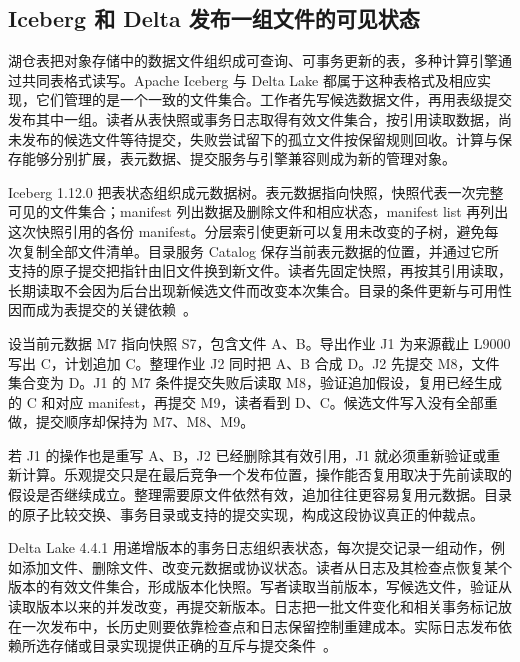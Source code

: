 \subsection{Iceberg 和 Delta 发布一组文件的可见状态}

湖仓表把对象存储中的数据文件组织成可查询、可事务更新的表，多种计算引擎通过共同表格式读写。Apache Iceberg 与 Delta Lake 都属于这种表格式及相应实现，它们管理的是一个一致的文件集合。工作者先写候选数据文件，再用表级提交发布其中一组。读者从表快照或事务日志取得有效文件集合，按引用读取数据，尚未发布的候选文件等待提交，失败尝试留下的孤立文件按保留规则回收。计算与保存能够分别扩展，表元数据、提交服务与引擎兼容则成为新的管理对象。

Iceberg 1.12.0 把表状态组织成元数据树。表元数据指向快照，快照代表一次完整可见的文件集合；manifest 列出数据及删除文件和相应状态，manifest list 再列出这次快照引用的各份 manifest。分层索引使更新可以复用未改变的子树，避免每次复制全部文件清单。目录服务 Catalog 保存当前表元数据的位置，并通过它所支持的原子提交把指针由旧文件换到新文件。读者先固定快照，再按其引用读取，长期读取不会因为后台出现新候选文件而改变本次集合。目录的条件更新与可用性因而成为表提交的关键依赖~\cite{ch21-iceberg}。


设当前元数据 M7 指向快照 S7，包含文件 A、B。导出作业 J1 为来源截止 L9000 写出 C，计划追加 C。整理作业 J2 同时把 A、B 合成 D。J2 先提交 M8，文件集合变为 D。J1 的 M7 条件提交失败后读取 M8，验证追加假设，复用已经生成的 C 和对应 manifest，再提交 M9，读者看到 D、C。候选文件写入没有全部重做，提交顺序却保持为 M7、M8、M9。

若 J1 的操作也是重写 A、B，J2 已经删除其有效引用，J1 就必须重新验证或重新计算。乐观提交只是在最后竞争一个发布位置，操作能否复用取决于先前读取的假设是否继续成立。整理需要原文件依然有效，追加往往更容易复用元数据。目录的原子比较交换、事务目录或支持的提交实现，构成这段协议真正的仲裁点。

Delta Lake 4.4.1 用递增版本的事务日志组织表状态，每次提交记录一组动作，例如添加文件、删除文件、改变元数据或协议状态。读者从日志及其检查点恢复某个版本的有效文件集合，形成版本化快照。写者读取当前版本，写候选文件，验证从读取版本以来的并发改变，再提交新版本。日志把一批文件变化和相关事务标记放在一次发布中，长历史则要依靠检查点和日志保留控制重建成本。实际日志发布依赖所选存储或目录实现提供正确的互斥与提交条件~\cite{ch21-delta}。


